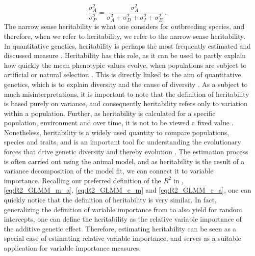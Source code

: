\begin{equation}
    \frac{\sigma^2_A}{\sigma^2_P} = \frac{\sigma^2_A}{\sigma^2_A + \sigma^2_D + \sigma^2_I + \sigma^2_E} \ .
\end{equation}
The narrow sense heritability is what one considers for outbreeding species, and therefore, when we refer to heritability, we refer to the narrow sense heritability.
In quantitative genetics, heritability is perhaps the most frequently estimated and discussed measure \citep{ConnerHartl2004}. Heritability has this role, as it can be used to partly explain how quickly the mean phenotypic values evolve, when populations are subject to artificial or natural selection \citep{ConnerHartl2004}. This is directly linked to the aim of quantitative genetics, which is to explain diversity and the cause of diversity \citep{Kruuk2004}. As a subject to much misinterpretations, it is important to note that the definition of heritability is based purely on variance, and consequently heritability refers only to variation within a population. Further, as heritability is calculated for a specific population, environment and over time, it is not to be viewed a fixed value \citep{ConnerHartl2004}. Nonetheless, heritability is a widely used quantity to compare populations, species and traits, and is an important tool for understanding the evolutionary forces that drive genetic diversity and thereby evolution \citep{ConnerHartl2004}. The estimation process is often carried out using the animal model, and as heritability is the result of a variance decomposition of the model fit, we can connect it to variable importance.
Recalling our preferred definition of the $R^2$ in , \eqref{eq:R2_GLMM_m_a}, \eqref{eq:R2_GLMM_c_m} and \eqref{eq:R2_GLMM_c_a}, one can quickly notice that the definition of heritability is very similar. In fact, generalizing the definition of variable importance from\citet{gromping_relaimpo} to also yield for random intercepts, one can define the heritability as the relative variable importance of the additive genetic effect. Therefore, estimating heritability can be seen as a special case of estimating relative variable importance, and serves as a suitable application for variable importance measures.
